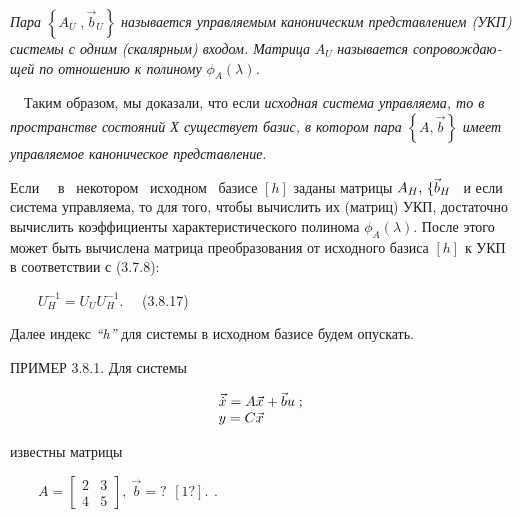\documentclass[a4paper]{article}
\newcommand\normalsubformula[1]{\text{\mathversion{normal}$#1$}}
\begin{document}
{\begin{russian}\sffamily
\textit{Пара } $\left\{A_U\;,\vec b_U\right\}$\textit{ называется управляемым каноническим представле­нием (УКП) системы
с одним (скалярным) входом. Матрица } $A_U$\textit{ называется сопровождающей по отношению к полиному }
$ϕ_A(λ)$\textit{.}
\end{russian}}

{\begin{russian}\sffamily
\ \ Таким образом, мы доказали, что если \textit{исходная система управ­ляема, то в пространстве состояний Х существует
базис, в котором пара } $\left\{Α,\vec b\right\}$\textit{ имеет управляемое каноническое представление}. 
\end{russian}}

{\begin{russian}\sffamily
Если \ \ в \ некотором \ исходном \ базисе  $[h]$ заданы матрицы  $A_H\text{,   \{}\vec{\normalsubformula b}_H$ \ и если
система управляема, то для того, чтобы вычислить их (матриц) УКП, достаточно вычислить коэффициенты
характеристичес­кого полинома  $ϕ_A(λ)$. После этого может быть вычислена матрица пре­образования от исходного базиса 
$[h]$ к УКП в соответствии с (3.7.8):
\end{russian}}

{\begin{russian}\sffamily
\ \ \ \  $U_H^{-1}=U_UU_H^{-1}$. \ \ (3.8.17)
\end{russian}}

{\begin{russian}\sffamily
Далее индекс \textit{“h” }для системы в исходном базисе будем опускать.
\end{russian}}


\bigskip

{\begin{russian}\sffamily
ПРИМЕР 3.8.1. Для системы
\end{russian}}

\begin{equation*}
\begin{matrix}\vec{\dot x}=A\vec x+\vec bu\;;\hfill\null \\y=C\vec x\hfill\null \end{matrix}\hfill 
\end{equation*}
{\begin{russian}\sffamily
известны матрицы
\end{russian}}

{\begin{russian}\sffamily
\ \ \ \  $A=\left[\begin{matrix}2&3\\4&5\end{matrix}\right],\ \vec b=?\begin{matrix}\left[1?\right].\end{matrix}$.
\end{russian}}
\end{document}

